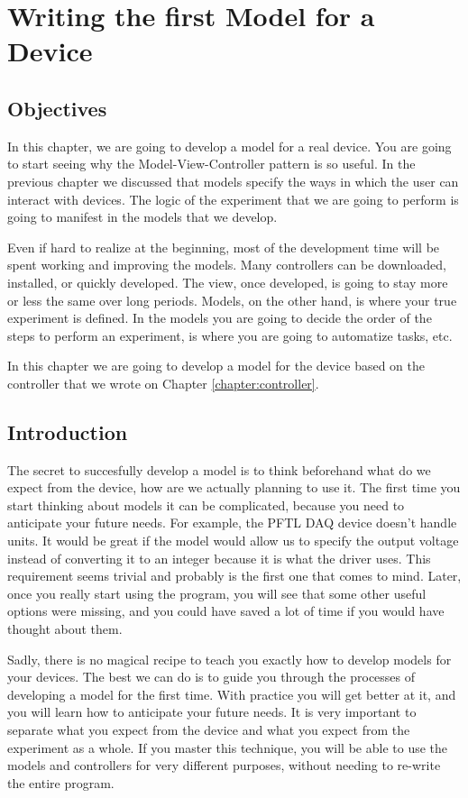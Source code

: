 \chapter{Writing the first Model for a Device}\label{writing-the-first-model-for-adevice}

\section{Objectives}
In this chapter, we are going to develop a model for a real device. You are going to start seeing why the Model-View-Controller pattern is so useful. In the previous chapter we discussed that models specify the ways in which the user can interact with devices. The logic of the experiment that we are going to perform is going to manifest in the models that we develop. 

Even if hard to realize at the beginning, most of the development time will be spent working and improving the models. Many controllers can be downloaded, installed, or quickly developed. The view, once developed, is going to stay more or less the same over long periods. Models, on the other hand, is where your true experiment is defined. In the models you are going to decide the order of the steps to perform an experiment, is where you are going to automatize tasks, etc. 

In this chapter we are going to develop a model for the device based on the controller that we wrote on Chapter \ref{chapter:controller}. 

\section{Introduction}
The secret to succesfully develop a model is to think beforehand what do we expect from the device, how are we actually planning to use it. The first time you start thinking about models it can be complicated, because you need to anticipate your future needs. For example, the PFTL DAQ device doesn't handle units. It would be great if the model would allow us to specify the output voltage instead of converting it to an integer because it is what the driver uses. This requirement seems trivial and probably is the first one that comes to mind. Later, once you really start using the program, you will see that some other useful options were missing, and you could have saved a lot of time if you would have thought about them. 

Sadly, there is no magical recipe to teach you exactly how to develop models for your devices. The best we can do is to guide you through the processes of developing a model for the first time. With practice you will get better at it, and you will learn how to anticipate your future needs. It is very important to separate what you expect from the device and what you expect from the experiment as a whole. If you master this technique, you will be able to use the models and controllers for very different purposes, without needing to re-write the entire program. 

